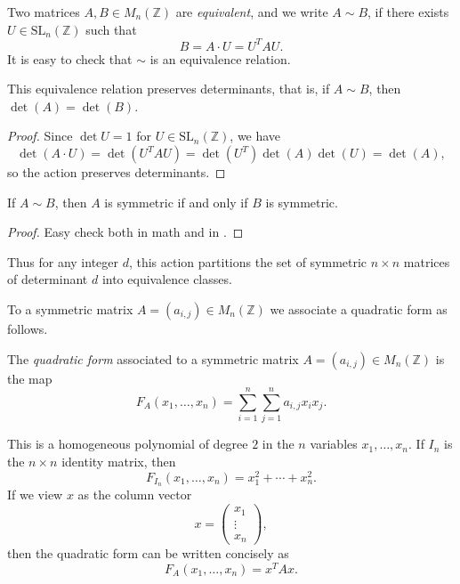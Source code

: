 \begin{construction}
\label{constr:mat_equivalence}
\leanok
Two matrices $A,B\in M_n(\mathbb{Z})$ are \emph{equivalent},
and we write $A\sim B$, if there exists $U\in\mathrm{SL}_n(\mathbb{Z})$
such that
\[
  B = A\cdot U = U^T A U.
\]
It is easy to check that $\sim$ is an equivalence relation.
\end{construction}

\begin{lemma}
\label{lem:mat_det_preserved}
\leanok
This equivalence relation preserves determinants, that is, if $A\sim B$, then $\det(A) = \det(B)$.
\end{lemma}

\begin{proof}
\leanok
Since $\det U = 1$ for $U\in\mathrm{SL}_n(\mathbb{Z})$, we have
\[
  \det(A\cdot U) = \det(U^T A U)
                = \det(U^T)\det(A)\det(U)
                = \det(A),\]
so the action preserves determinants. 
\end{proof}

\begin{lemma}
\label{lem:mat_symm_preserved}
If $A\sim B$, then $A$ is symmetric if and only if $B$ is symmetric.
\end{lemma}
\begin{proof}
\leanok
Easy check both in math and in .
\end{proof}

Thus for any integer $d$, this action partitions the set of symmetric
$n\times n$ matrices of determinant $d$ into equivalence classes.

\medskip

To a symmetric matrix $A=(a_{i,j})\in M_n(\mathbb{Z})$ we associate
a quadratic form as follows.

\begin{definition}
The \emph{quadratic form} associated to a symmetric matrix
$A=(a_{i,j})\in M_n(\mathbb{Z})$ is the map
\[
  F_A(x_1,\dots,x_n)
  = \sum_{i=1}^n\sum_{j=1}^n a_{i,j} x_i x_j .
\]
\end{definition}

This is a homogeneous polynomial of degree $2$ in the $n$ variables
$x_1,\dots,x_n$.
If $I_n$ is the $n\times n$ identity matrix, then
\[
  F_{I_n}(x_1,\dots,x_n) = x_1^2 + \cdots + x_n^2 .
\]
If we view $x$ as the column vector
\[
  x = \begin{pmatrix}x_1\\ \vdots\\ x_n\end{pmatrix},
\]
then the quadratic form can be written concisely as
\[
  F_A(x_1,\dots,x_n) = x^T A x .
\]

